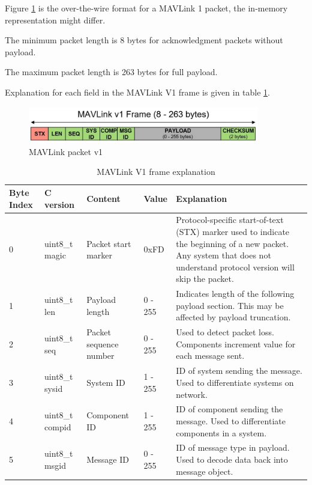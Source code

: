 \documentclass[\main/thesis.tex]{subfiles}
\begin{document}
Figure \ref{fig:packet_mavlink_v1} is the over-the-wire format for a MAVLink 1 packet, the in-memory representation might differ.

The minimum packet length is 8 bytes for acknowledgment packets without payload.

The maximum packet length is 263 bytes for full payload.

Explanation for each field in the MAVLink V1 frame is given in table \ref{tab:mavlink_v1_frame_explanation}.
\begin{figure}[H]
    \begin{center}
        \includegraphics[width=0.9\textwidth]{packet_mavlink_v1.jpg}
    \end{center}
    \caption{MAVLink packet v1}
    \label{fig:packet_mavlink_v1}
\end{figure}

\begin{table}[H]
    \begin{tabular}{ | p{1.3cm} | p{1.8cm} | p{2cm} | l | p{9cm} |}
    \hline
    Byte Index & C version & Content & Value & Explanation \\\hline
    0 & uint8\_t magic & Packet start marker	& 0xFD & Protocol-specific start-of-text (STX) marker used to indicate the beginning of a new packet. Any system that does not understand protocol version will skip the packet. \\\hline
    1 & uint8\_t len & Payload length & 0 - 255	& Indicates length of the following payload section. This may be affected by payload truncation. \\\hline
    2 & uint8\_t seq	& Packet sequence number & 0 - 255 & Used to detect packet loss. Components increment value for each message sent. \\\hline
    3 & uint8\_t sysid & System ID & 1 - 255 & ID of system  sending the message. Used to differentiate systems on network.\\\hline
    4 & uint8\_t compid	& Component ID & 1 - 255 & ID of component sending the message. Used to differentiate components in a system. \\\hline
    5 & uint8\_t msgid & Message ID & 0 - 255 & ID of message type in payload. Used to decode data back into message object.\\\hline
    \end{tabular}
    \caption{MAVLink V1 frame explanation}
    \label{tab:mavlink_v1_frame_explanation}
\end{table}
\end{document}
